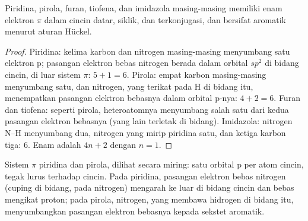 \begin{proposition}\label{prop:b3:heterocycles:sextet}
Piridina, pirola, furan, tiofena, dan imidazola masing-masing memiliki enam elektron $\pi$ dalam
cincin datar, siklik, dan terkonjugasi, dan bersifat aromatik menurut aturan Hückel.
\end{proposition}

\begin{proof}
Piridina: kelima karbon dan nitrogen masing-masing menyumbang satu elektron p; pasangan elektron bebas
nitrogen berada dalam orbital $sp^2$ di bidang cincin, di luar sistem $\pi$: $5 + 1 = 6$.
Pirola: empat karbon masing-masing menyumbang satu, dan nitrogen, yang terikat pada H di bidang itu,
menempatkan pasangan elektron bebasnya dalam orbital p-nya: $4 + 2 = 6$. Furan dan tiofena: seperti pirola,
heteroatomnya menyumbang salah satu dari kedua pasangan elektron bebasnya (yang lain terletak di bidang). Imidazola:
nitrogen N--H menyumbang dua, nitrogen yang mirip piridina satu, dan ketiga karbon
tiga: 6. Enam adalah $4n + 2$ dengan $n = 1$.
\end{proof}

\begin{omfigure}

{\small Sistem $\pi$ piridina dan pirola, dilihat secara miring: satu orbital p per
atom cincin, tegak lurus terhadap cincin. Pada piridina, pasangan elektron bebas nitrogen (cuping di bidang, pada
nitrogen) mengarah ke luar di bidang cincin dan bebas mengikat proton; pada pirola,
nitrogen, yang membawa hidrogen di bidang itu, menyumbangkan pasangan elektron bebasnya kepada
sekstet aromatik.}
\end{omfigure}

